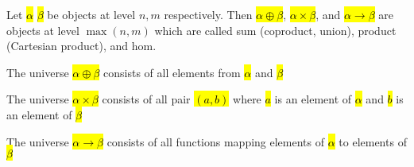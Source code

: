 Let \hl{$\alpha$} \hl{$\beta$} be objects at level $n, m$ respectively. Then \hl{$\alpha \oplus \beta$}, \hl{$\alpha \times \beta$}, and \hl{$\alpha \to \beta$} are objects at level $\max(n, m)$ which are called sum (coproduct, union), product (Cartesian product), and hom.

The universe \hl{$\alpha \oplus \beta$} consists of all elements from \hl{$\alpha$} and \hl{$\beta$}

The universe \hl{$\alpha \times \beta$} consists of all pair \hl{$(a, b)$} where \hl{$a$} is an element of \hl{$\alpha$} and \hl{$b$} is an element of \hl{$\beta$}

The universe \hl{$\alpha \to \beta$} consists of all functions mapping elements of \hl{$\alpha$} to elements of \hl{$\beta$}




